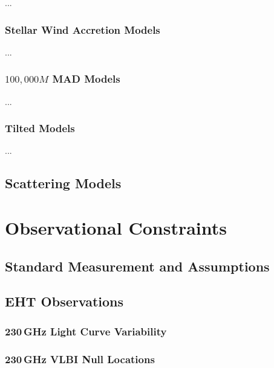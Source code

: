 \documentclass[twocolumn,twocolappendix,tighten,dvipsnames,linenumbers]{aastex63}
\begin{document}
...

\subsubsection{Stellar Wind Accretion Models}

...

\subsubsection{$100,000M$ MAD Models}

...

\subsubsection{Tilted Models}

...

\subsection{Scattering Models}

\clearpage

\section{Observational Constraints}

\subsection{Standard Measurement and Assumptions}

\subsection{EHT Observations}
\subsubsection{230\,GHz Light Curve Variability}
\subsubsection{230\,GHz VLBI Null Locations}
\end{document}
